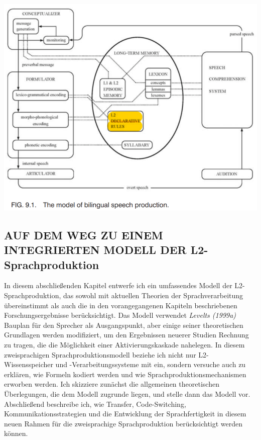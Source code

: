 \documentclass[
  letterpaper,
]{scrbook}
\begin{document}
\includegraphics[width=1\textwidth,height=\textheight]{./pictures/kormos_L2_speech_production_model.png}

\hypertarget{auf-dem-weg-zu-einem-integrierten-modell-der-l2-sprachproduktion}{%
\subsection{AUF DEM WEG ZU EINEM INTEGRIERTEN MODELL DER
L2-Sprachproduktion}\label{auf-dem-weg-zu-einem-integrierten-modell-der-l2-sprachproduktion}}

In diesem abschließenden Kapitel entwerfe ich ein umfassendes Modell der
L2-Sprachproduktion, das sowohl mit aktuellen Theorien der
Sprachverarbeitung übereinstimmt als auch die in den vorangegangenen
Kapiteln beschriebenen Forschungsergebnisse berücksichtigt. Das Modell
verwendet \emph{Levelts (1999a)} Bauplan für den Sprecher als
Ausgangspunkt, aber einige seiner theoretischen Grundlagen werden
modifiziert, um den Ergebnissen neuerer Studien Rechnung zu tragen, die
die Möglichkeit einer Aktivierungskaskade nahelegen. In diesem
zweisprachigen Sprachproduktionsmodell beziehe ich nicht nur
L2-Wissensspeicher und -Verarbeitungssysteme mit ein, sondern versuche
auch zu erklären, wie Formeln kodiert werden und wie
Sprachproduktionsmechanismen erworben werden. Ich skizziere zunächst die
allgemeinen theoretischen Überlegungen, die dem Modell zugrunde liegen,
und stelle dann das Modell vor. Abschließend beschreibe ich, wie
Transfer, Code-Switching, Kommunikationsstrategien und die Entwicklung
der Sprachfertigkeit in diesem neuen Rahmen für die zweisprachige
Sprachproduktion berücksichtigt werden können.
\end{document}
